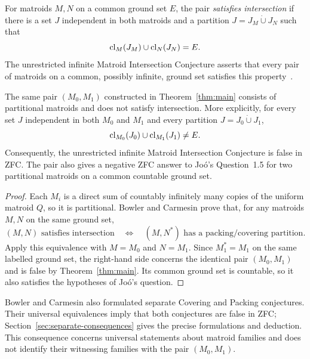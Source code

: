For matroids $M,N$ on a common ground set $E$, the pair \emph{satisfies
intersection} if there is a set $J$ independent in both matroids and a
partition $J=J_M\dot\cup J_N$ such that
\[
 \operatorname{cl}_M(J_M)\cup\operatorname{cl}_N(J_N)=E.
\]
The unrestricted infinite Matroid Intersection Conjecture asserts that
every pair of matroids on a common, possibly infinite, ground set satisfies this
property~\cite[Definition~3.5 and Section~7]{BowlerCarmesin2015}.

\begin{corollary}\label{cor:intersection}
The same pair $(M_0,M_1)$ constructed in Theorem~\ref{thm:main} consists of
partitional matroids and does not satisfy intersection. More explicitly,
for every set $J$ independent in both $M_0$ and $M_1$ and every partition
$J=J_0\dot\cup J_1$,
\[
 \operatorname{cl}_{M_0}(J_0)\cup\operatorname{cl}_{M_1}(J_1)\ne E.
\]
Consequently, the unrestricted infinite Matroid Intersection Conjecture is
false in ZFC. The pair also gives a negative ZFC answer to Jo\'o's
Question~1.5 for two partitional matroids on a common countable ground set.
\end{corollary}

\begin{proof}
Each $M_i$ is a direct sum of countably infinitely many copies of the uniform
matroid $Q$, so it is partitional. Bowler and Carmesin
\cite[Proposition~3.6]{BowlerCarmesin2015} prove that, for any matroids $M,N$
on the same ground set,
\[
 (M,N)\text{ satisfies intersection}
 \quad\Longleftrightarrow\quad
 (M,N^*)\text{ has a packing/covering partition}.
\]
Apply this equivalence with $M=M_0$ and $N=M_1$. Since $M_1^*=M_1$ on the same labelled ground set,
the right-hand side concerns the identical pair $(M_0,M_1)$ and is false by
Theorem~\ref{thm:main}. Its common ground set is countable, so it also
satisfies the hypotheses of Jo\'o's question.
\end{proof}

Bowler and Carmesin also formulated separate Covering and Packing
conjectures. Their universal equivalences imply that both conjectures are
false in ZFC; Section~\ref{sec:separate-consequences} gives the precise
formulations and deduction. This consequence concerns universal statements
about matroid families and does not identify their witnessing families
with the pair $(M_0,M_1)$.

